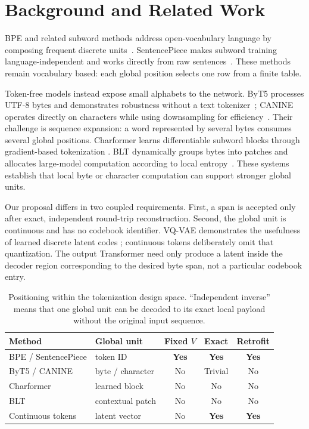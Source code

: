 \documentclass[10pt,twocolumn]{article}
\newcommand{\yes}{\textbf{Yes}}
\newcommand{\no}{No}
\begin{document}
\section{Background and Related Work}

BPE and related subword methods address open-vocabulary language by composing frequent discrete
units~\citep{sennrich2016bpe}. SentencePiece makes subword training language-independent and works
directly from raw sentences~\citep{kudo2018sentencepiece}. These methods remain vocabulary based:
each global position selects one row from a finite table.

Token-free models instead expose small alphabets to the network. ByT5 processes UTF-8 bytes and
demonstrates robustness without a text tokenizer~\citep{xue2022byt5}; CANINE operates directly on
characters while using downsampling for efficiency~\citep{clark2022canine}. Their challenge is
sequence expansion: a word represented by several bytes consumes several global positions.
Charformer learns differentiable subword blocks through gradient-based tokenization
\citep{tay2022charformer}. BLT dynamically groups bytes into patches and allocates large-model
computation according to local entropy~\citep{pagnoni2024blt}. These systems establish that local
byte or character computation can support stronger global units.

Our proposal differs in two coupled requirements. First, a span is accepted only after exact,
independent round-trip reconstruction. Second, the global unit is continuous and has no codebook
identifier. VQ-VAE demonstrates the usefulness of learned discrete latent codes
\citep{oord2017vqvae}; continuous tokens deliberately omit that quantization. The output Transformer
need only produce a latent inside the decoder region corresponding to the desired byte span, not a
particular codebook entry.

\begin{table}[t]
\centering
\caption{Positioning within the tokenization design space. ``Independent inverse'' means that one
global unit can be decoded to its exact local payload without the original input sequence.}
\label{tab:related}
\scriptsize
\begin{tabularx}{\columnwidth}{@{}l >{\raggedright\arraybackslash}X c c c@{}}
\toprule
Method & Global unit & Fixed $V$ & Exact & Retrofit \\
\midrule
BPE / SentencePiece & token ID & \yes & \yes & \yes \\
ByT5 / CANINE & byte / character & \no & Trivial & \no \\
Charformer & learned block & \no & \no & \no \\
BLT & contextual patch & \no & \no & \no \\
Continuous tokens & latent vector & \no & \yes & \yes \\
\bottomrule
\end{tabularx}
\end{table}
\end{document}
